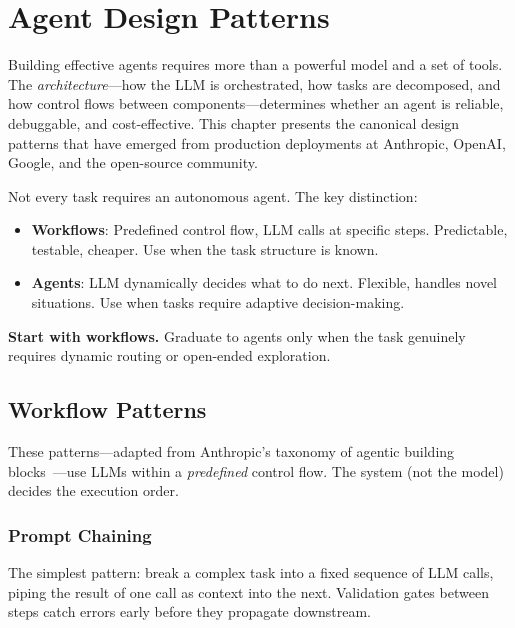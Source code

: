 \chapter{Agent Design Patterns}
\label{sec:agent-design-patterns}

Building effective agents requires more than a powerful model and a set of tools. The \emph{architecture}---how the LLM is orchestrated, how tasks are decomposed, and how control flows between components---determines whether an agent is reliable, debuggable, and cost-effective. This chapter presents the canonical design patterns that have emerged from production deployments at Anthropic, OpenAI, Google, and the open-source community.

\begin{intuitionbox}
Not every task requires an autonomous agent. The key distinction:

\begin{itemize}
  \item \textbf{Workflows}: Predefined control flow, LLM calls at specific steps. Predictable, testable, cheaper. Use when the task structure is known.
  \item \textbf{Agents}: LLM dynamically decides what to do next. Flexible, handles novel situations. Use when tasks require adaptive decision-making.
\end{itemize}

\textbf{Start with workflows.} Graduate to agents only when the task genuinely requires dynamic routing or open-ended exploration.
\end{intuitionbox}

\section{Workflow Patterns}
\label{workflow-patterns}

These patterns---adapted from Anthropic’s taxonomy of agentic building blocks~\cite{anthropic2024buildingagents}---use LLMs within a \emph{predefined} control flow. The system (not the model) decides the execution order.

\subsection{Prompt Chaining}
\label{prompt-chaining}

The simplest pattern: break a complex task into a fixed sequence of LLM calls, piping the result of one call as context into the next. Validation gates between steps catch errors early before they propagate downstream.

